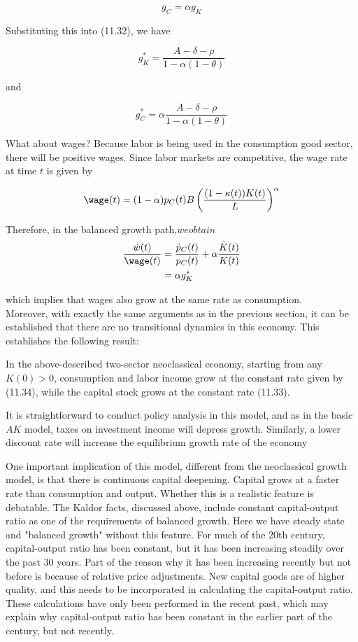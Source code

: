 \documentclass[\topdir/lecture\_notes.tex]{subfiles}
\begin{document}
\[
g_{C}=\alpha g_{K}
\]

Substituting this into (11.32), we have

\[
g_{K}^{*}=\frac{A-\delta-\rho}{1-\alpha(1-\theta)}
\]

and

\[
g_{C}^{*}=\alpha \frac{A-\delta-\rho}{1-\alpha(1-\theta)}
\]

What about wages? Because labor is being used in the consumption good sector, there will be positive wages. Since labor markets are competitive, the wage rate at time $t$ is given by

\[
\wage(t)=(1-\alpha) p_{C}(t) B\left(\frac{(1-\kappa(t)) K(t)}{L}\right)^{\alpha}
\]

Therefore, in the balanced growth path,$ we obtain $\[
\begin{aligned}
\frac{\dot{w}(t)}{\wage(t)} & =\frac{\dot{p}_{C}(t)}{p_{C}(t)}+\alpha \frac{\dot{K}(t)}{K(t)} \\
& =\alpha g_{K}^{*}
\end{aligned}
\]

which implies that wages also grow at the same rate as consumption.\\
Moreover, with exactly the same arguments as in the previous section, it can be established that there are no transitional dynamics in this economy. This establishes the following result:
\begin{proposition}
In the above-described two-sector neoclassical economy, starting from any $K(0)>0$, consumption and labor income grow at the constant rate given by (11.34), while the capital stock grows at the constant rate (11.33).
\end{proposition}

It is straightforward to conduct policy analysis in this model, and as in the basic $AK$ model, taxes on investment income will depress growth. Similarly, a lower discount rate will increase the equilibrium growth rate of the economy

One important implication of this model, different from the neoclassical growth model, is that there is continuous capital deepening. Capital grows at a faster rate than consumption and output. Whether this is a realistic feature is debatable. The Kaldor facts, discussed above, include constant capital-output ratio as one of the requirements of balanced growth. Here we have steady state and "balanced growth" without this feature. For much of the 20th century, capital-output ratio has been constant, but it has been increasing steadily over the past 30 years. Part of the reason why it has been increasing recently but not before is because of relative price adjustments. New capital goods are of higher quality, and this needs to be incorporated in calculating the capital-output ratio. These calculations have only been performed in the recent past, which may explain why capital-output ratio has been constant in the earlier part of the century, but not recently.
\end{document}
